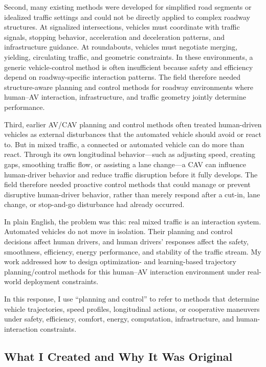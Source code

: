 \documentclass[11pt,letterpaper]{article}
\begin{document}
Second, many existing methods were developed for simplified road segments or idealized traffic settings and could not be directly applied to complex roadway structures. At signalized intersections, vehicles must coordinate with traffic signals, stopping behavior, acceleration and deceleration patterns, and infrastructure guidance. At roundabouts, vehicles must negotiate merging, yielding, circulating traffic, and geometric constraints. In these environments, a generic vehicle-control method is often insufficient because safety and efficiency depend on roadway-specific interaction patterns. The field therefore needed structure-aware planning and control methods for roadway environments where human--AV interaction, infrastructure, and traffic geometry jointly determine performance.

Third, earlier AV/CAV planning and control methods often treated human-driven vehicles as external disturbances that the automated vehicle should avoid or react to. But in mixed traffic, a connected or automated vehicle can do more than react. Through its own longitudinal behavior---such as adjusting speed, creating gaps, smoothing traffic flow, or assisting a lane change---a CAV can influence human-driver behavior and reduce traffic disruption before it fully develops. The field therefore needed proactive control methods that could manage or prevent disruptive human-driver behavior, rather than merely respond after a cut-in, lane change, or stop-and-go disturbance had already occurred.

In plain English, the problem was this: real mixed traffic is an interaction system. Automated vehicles do not move in isolation. Their planning and control decisions affect human drivers, and human drivers' responses affect the safety, smoothness, efficiency, energy performance, and stability of the traffic stream. My work addressed how to design optimization- and learning-based trajectory planning/control methods for this human--AV interaction environment under real-world deployment constraints.

In this response, I use ``planning and control'' to refer to methods that determine vehicle trajectories, speed profiles, longitudinal actions, or cooperative maneuvers under safety, efficiency, comfort, energy, computation, infrastructure, and human-interaction constraints.

\subsection{What I Created and Why It Was Original}
\end{document}
